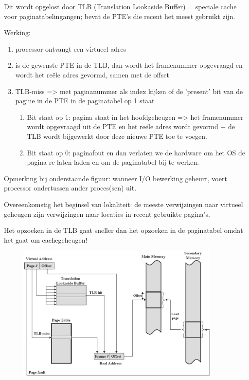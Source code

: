 Dit wordt opgelost door TLB (Translation Lookaside Buffer) = speciale cache voor paginatabelingangen; bevat de PTE's die recent het meest gebruikt zijn.

Werking:

\begin{enumerate}
    \item processor ontvangt een virtueel adres
    \item is de gewenste PTE in de TLB, dan wordt het framenummer opgevraagd en wordt het reële adres gevormd, samen met de offset
    \item TLB-miss => met paginanummer als index kijken of de 'present' bit van de pagine in de PTE in de paginatabel op 1 staat
        \begin{enumerate}
        \item Bit staat op 1: pagina staat in het hoofdgeheugen => het framenummer wordt opgevraagd uit de PTE en het reële adres wordt gevormd + de TLB wordt bijgewerkt door deze nieuwe PTE toe te voegen.
        \item Bit staat op 0: paginafout en dan verlaten we de hardware om het OS de pagina re laten laden en om de paginatabel bij te werken.
        \end{enumerate}
\end{enumerate}

Opmerking bij onderstaande figuur: wanneer I/O bewerking gebeurt, voert processor ondertussen ander proces(sen) uit.

Overeenkomstig het beginsel van lokaliteit: de meeste verwijzingen naar virtueel geheugen zijn verwijzingen naar locaties in recent gebruikte pagina's.

Het opzoeken in de TLB gaat sneller dan het opzoeken in de paginatabel omdat het gaat om cachegeheugen!

\begin{figure}[htp]
    \centering
            \includegraphics[width=4in]{img/tlb}
        \caption{}
    \label{fig:}
\end{figure}


